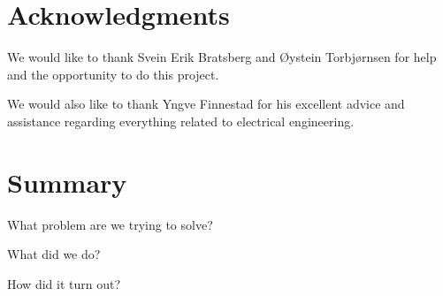 \clearpage
\section{Acknowledgments}
We would like to thank Svein Erik Bratsberg and \O ystein Torbj\o rnsen for help and the opportunity to do this project.

We would also like to thank Yngve Finnestad for his excellent advice and assistance regarding everything related to electrical engineering.

\section{Summary}

What problem are we trying to solve?

What did we do?

How did it turn out?


